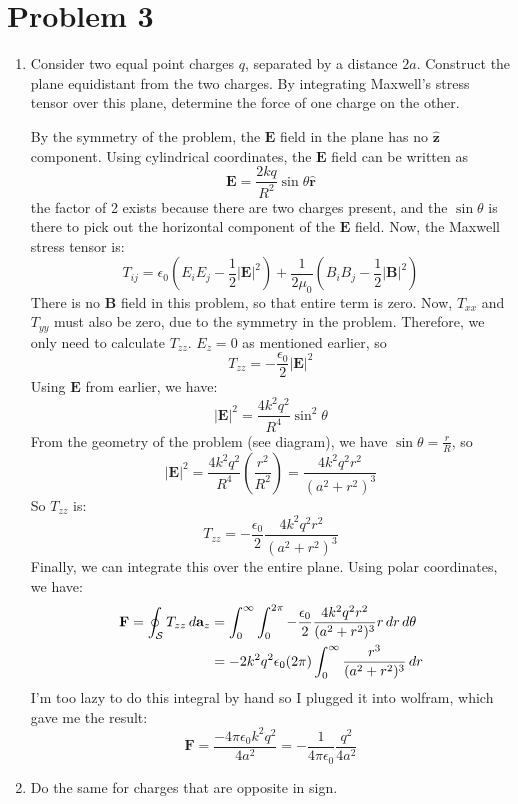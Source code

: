 \documentclass[10pt]{article}
\begin{document}
	\section*{Problem 3}
	\begin{enumerate}[label=(\alph*)]
		\item Consider two equal point charges \( q \), separated by a distance \( 2a \). Construct the plane
			equidistant from the two charges. By integrating Maxwell's stress tensor over this plane,
			determine the force of one charge on the other.

			\begin{solution}
				By the symmetry of the problem, the \( \mathbf{E} \) field in the plane has no 
				\( \hat{\mathbf{z}} \) component. Using cylindrical coordinates, the \( \mathbf{E} \) field
				can be written as
				\[
					\mathbf{E} = \frac{2kq}{R^2} \sin \theta \hat{\mathbf{r}}
				\]
				the factor of 2 exists because there are two charges present, and the \( \sin \theta \) is
				there to pick out the horizontal component of the \( \mathbf{E} \) field. Now, the Maxwell
				stress tensor is:
				\[
					T_{ij} = \epsilon_0 \left(E_i E_j - \frac{1}{2}|\mathbf{E}|^2\right) +
					\frac{1}{2\mu_0}\left( B_iB_j - \frac{1}{2}|\mathbf{B}|^2 \right)
				\]
				There is no \( \mathbf{B} \) field in this problem, so that entire term is zero. Now, \(
				T_{x x} \) and \( T_{yy} \) must also be zero, due to the symmetry in the problem. Therefore,
				we only need to calculate \( T_{zz} \). \( E_z = 0 \) as mentioned earlier, so
				\[
					T_{zz} = -\frac{\epsilon_0}{2} |\mathbf{E}|^2
				\]
				Using \( \mathbf{E} \) from earlier, we have:
				\[
					|\mathbf{E}|^2 = \frac{4 k^2 q^2}{R^{4}} \sin^2 \theta
				\]
				From the geometry of the problem (see diagram), we have \( \sin \theta = \frac{r}{R} \), so
				\[
					|\mathbf{E}|^2 = \frac{4k^2 q^2}{R^{4}}\left( \frac{r^2}{R^2} \right) =
					\frac{4k^2q^2r^2}{(a^2 + r^2)^3}
				\]
				So \( T_{zz} \) is:
				\[
					T_{zz} = -\frac{\epsilon_0}{2}\frac{4k^2q^2r^2}{(a^2 + r^2)^3}
				\]
				Finally, we can integrate this over the entire plane. Using polar coordinates, we have:
				\begin{align*}
					\mathbf{F} = \oint_{\mathcal{S}}T_{zz}\,d \mathbf{a}_z &=
					\int_{0}^{\infty}\int_{0}^{2\pi} - \frac{\epsilon_0}{2} \frac{4k^2q^2r^2}{(a^2 + r^2)^3}r
					\,d r \,d \theta\\ 
					&= -2k^2q^2 \epsilon_0 (2\pi) \int_{0}^{\infty}\frac{r^3}{(a^2 + r^2)^3} \,d r 
				\end{align*}
				I'm too lazy to do this integral by hand so I plugged it into wolfram, which gave me the
				result:
				\[
					\mathbf{F} = \frac{-4\pi \epsilon_0 k^2 q^2}{4a^2} = -\frac{1}{4 \pi
					\epsilon_0}\frac{q^2}{4a^2}
				\]
			\end{solution}
		\item Do the same for charges that are opposite in sign. 


\end{enumerate}
\end{document}
